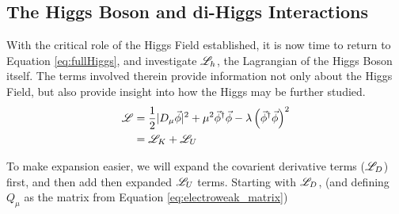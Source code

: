     \subsection{The Higgs Boson and di-Higgs Interactions}

        With the critical role of the Higgs Field established, it is now time to return to Equation \ref{eq:fullHiggs},
            and investigate $\mathscr{L}_h$, the Lagrangian of the Higgs Boson itself.
        The terms involved therein provide information not only about the Higgs Field,
            but also provide insight into how the Higgs may be further studied.
        \begin{equation} \begin{split}
            \mathscr{L} &= \frac{1}{2} |D_{\mu} \vec{\phi}|^2 +
                \mu^2 \vec{\phi}^\dag \vec{\phi} - \lambda \left( \vec{\phi}^\dag\vec{\phi} \right)^2
            \\&= \mathscr{L}_K + \mathscr{L}_U
        \end{split} \end{equation}
        
        To make expansion easier, we will expand the covarient derivative terms ($\mathscr{L}_D$) first,
            and then add then expanded $\mathscr{L}_U$ terms.
        Starting with $\mathscr{L}_D$, (and defining $Q_{\mu}$ as the matrix from Equation \ref{eq:electroweak_matrix})

